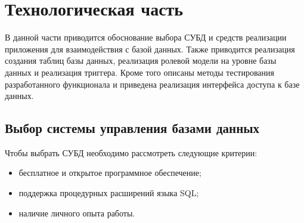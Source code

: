 \chapter{Технологическая часть}

В данной части приводится обоснование выбора СУБД и средств реализации приложения для взаимодействия с базой данных. Также приводится реализация создания таблиц базы данных, реализация ролевой модели на уровне базы данных и реализация триггера. Кроме того описаны методы тестирования разработанного функционала и приведена реализация интерфейса доступа к базе данных.

\section{Выбор системы управления базами данных}

Чтобы выбрать СУБД необходимо рассмотреть следующие критерии:
\begin{itemize}
    \item бесплатное и открытое программное обеспечение;
    \item поддержка процедурных расширений языка SQL;
    \item наличие личного опыта работы.
\end{itemize}

\begin{table}[H]
    \caption{\label{tbl:dbms}}
\end{table}

